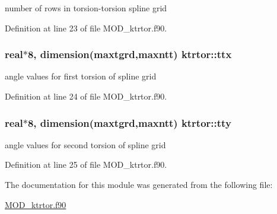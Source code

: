 number of rows in torsion-\/torsion spline grid 



Definition at line 23 of file M\-O\-D\-\_\-ktrtor.\-f90.

\hypertarget{classktrtor_ad5663a5bb938d0665ee40737ac9e49b8}{
\subsubsection[{ttx}]{\setlength{\rightskip}{0pt plus 5cm}real$\ast$8, dimension({\bf maxtgrd},{\bf maxntt}) ktrtor\-::ttx}}\label{classktrtor_ad5663a5bb938d0665ee40737ac9e49b8}


angle values for first torsion of spline grid 



Definition at line 24 of file M\-O\-D\-\_\-ktrtor.\-f90.

\hypertarget{classktrtor_aed5da189159d6c5dbba622a8e859e839}{
\subsubsection[{tty}]{\setlength{\rightskip}{0pt plus 5cm}real$\ast$8, dimension({\bf maxtgrd},{\bf maxntt}) ktrtor\-::tty}}\label{classktrtor_aed5da189159d6c5dbba622a8e859e839}


angle values for second torsion of spline grid 



Definition at line 25 of file M\-O\-D\-\_\-ktrtor.\-f90.



The documentation for this module was generated from the following file\-:\begin{DoxyCompactItemize}
\item 
\hyperlink{MOD__ktrtor_8f90}{M\-O\-D\-\_\-ktrtor.\-f90}\end{DoxyCompactItemize}
